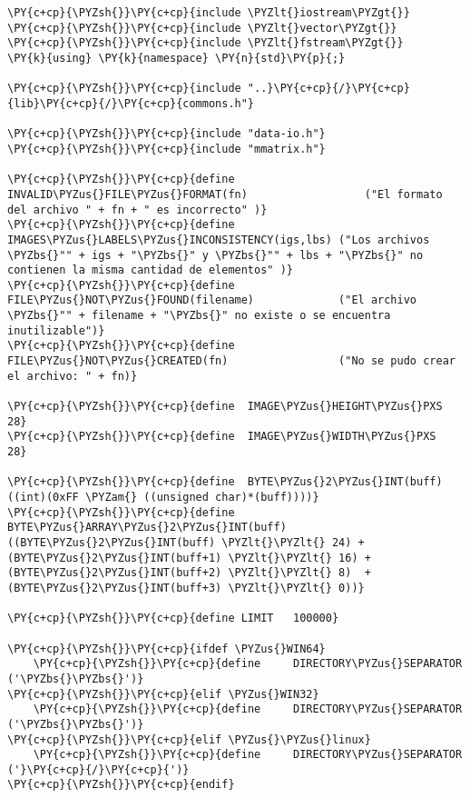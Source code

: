 \begin{Verbatim}[commandchars=\\\{\}]
\PY{c+cp}{\PYZsh{}}\PY{c+cp}{include \PYZlt{}iostream\PYZgt{}}
\PY{c+cp}{\PYZsh{}}\PY{c+cp}{include \PYZlt{}vector\PYZgt{}}
\PY{c+cp}{\PYZsh{}}\PY{c+cp}{include \PYZlt{}fstream\PYZgt{}}
\PY{k}{using} \PY{k}{namespace} \PY{n}{std}\PY{p}{;}

\PY{c+cp}{\PYZsh{}}\PY{c+cp}{include "..}\PY{c+cp}{/}\PY{c+cp}{lib}\PY{c+cp}{/}\PY{c+cp}{commons.h"}

\PY{c+cp}{\PYZsh{}}\PY{c+cp}{include "data-io.h"}
\PY{c+cp}{\PYZsh{}}\PY{c+cp}{include "mmatrix.h"}

\PY{c+cp}{\PYZsh{}}\PY{c+cp}{define	 INVALID\PYZus{}FILE\PYZus{}FORMAT(fn)					("El formato del archivo " + fn + " es incorrecto" )}
\PY{c+cp}{\PYZsh{}}\PY{c+cp}{define	 IMAGES\PYZus{}LABELS\PYZus{}INCONSISTENCY(igs,lbs)	("Los archivos \PYZbs{}"" + igs + "\PYZbs{}" y \PYZbs{}"" + lbs + "\PYZbs{}" no contienen la misma cantidad de elementos" )}
\PY{c+cp}{\PYZsh{}}\PY{c+cp}{define	 FILE\PYZus{}NOT\PYZus{}FOUND(filename)				("El archivo \PYZbs{}"" + filename + "\PYZbs{}" no existe o se encuentra inutilizable")}
\PY{c+cp}{\PYZsh{}}\PY{c+cp}{define	 FILE\PYZus{}NOT\PYZus{}CREATED(fn)					("No se pudo crear el archivo: " + fn)}

\PY{c+cp}{\PYZsh{}}\PY{c+cp}{define	 IMAGE\PYZus{}HEIGHT\PYZus{}PXS	28}
\PY{c+cp}{\PYZsh{}}\PY{c+cp}{define	 IMAGE\PYZus{}WIDTH\PYZus{}PXS		28}

\PY{c+cp}{\PYZsh{}}\PY{c+cp}{define	 BYTE\PYZus{}2\PYZus{}INT(buff)		 	((int)(0xFF \PYZam{} ((unsigned char)*(buff))))}
\PY{c+cp}{\PYZsh{}}\PY{c+cp}{define BYTE\PYZus{}ARRAY\PYZus{}2\PYZus{}INT(buff) 		((BYTE\PYZus{}2\PYZus{}INT(buff) \PYZlt{}\PYZlt{} 24) + (BYTE\PYZus{}2\PYZus{}INT(buff+1) \PYZlt{}\PYZlt{} 16) + (BYTE\PYZus{}2\PYZus{}INT(buff+2) \PYZlt{}\PYZlt{} 8)  + (BYTE\PYZus{}2\PYZus{}INT(buff+3) \PYZlt{}\PYZlt{} 0))}

\PY{c+cp}{\PYZsh{}}\PY{c+cp}{define LIMIT	100000}

\PY{c+cp}{\PYZsh{}}\PY{c+cp}{ifdef \PYZus{}WIN64}
	\PY{c+cp}{\PYZsh{}}\PY{c+cp}{define		DIRECTORY\PYZus{}SEPARATOR		('\PYZbs{}\PYZbs{}')}
\PY{c+cp}{\PYZsh{}}\PY{c+cp}{elif \PYZus{}WIN32}
	\PY{c+cp}{\PYZsh{}}\PY{c+cp}{define		DIRECTORY\PYZus{}SEPARATOR		('\PYZbs{}\PYZbs{}')}
\PY{c+cp}{\PYZsh{}}\PY{c+cp}{elif \PYZus{}\PYZus{}linux}
	\PY{c+cp}{\PYZsh{}}\PY{c+cp}{define		DIRECTORY\PYZus{}SEPARATOR		('}\PY{c+cp}{/}\PY{c+cp}{')}
\PY{c+cp}{\PYZsh{}}\PY{c+cp}{endif}


\end{Verbatim}
